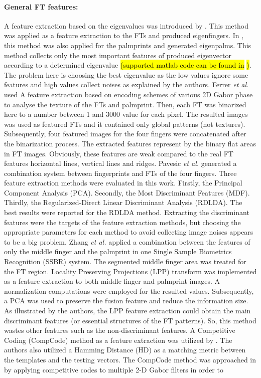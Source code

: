 \documentclass[review]{elsarticle}
\begin{document}
	\paragraph{\textbf{General FT features:}} A feature extraction based on the eigenvalues was introduced by \cite{Ribaric2005Anonline,Ribaric2005ABiometric}. This method was applied as a feature extraction to the FTs and produced eigenfingers. In \cite{Ribaric2005ABiometric}, this method was also applied for the palmprints and generated eigenpalms. This method collects only the most important features of produced eigenvector according to a determined eigenvalue \hl{(supported matlab code can be found in} \cite{Eigenvalues_Eigenvectors}\hl{)}. The problem here is choosing the best eigenvalue as the low values ignore some features and high values collect noises as explained by the authors. Ferrer \textit{et al.} \cite{Ferrer2007Low} used A feature extraction based on encoding schemes of various 2D Gabor phase \cite{gabor_filter} to analyse the texture of the FTs and palmprint. Then, each FT was binarized here to a number between 1 and 3000 value for each pixel. The resulted images was used as featured FTs and it contained only global patterns (not textures). Subsequently, four featured images for the four fingers were concatenated after the binarization process. The extracted features represent by the binary flat areas in FT images. Obviously, these features are weak compared to the real FT features horizontal lines, vertical lines and ridges. Pavesic \textit{et al.} \cite{Pavesic2009Finger-based} generated a combination system between fingerprints and FTs of the four fingers. Three feature extraction methods were evaluated in this work. Firstly, the Principal Component Analysis (PCA). Secondly, the Most Discriminant Features (MDF). Thirdly, the Regularized-Direct Linear Discriminant Analysis (RDLDA). The best results were reported for the RDLDA method. Extracting the discriminant features were the targets of the feature extraction methods, but choosing the appropriate parameters for each method to avoid collecting image noises appears to be a big problem. Zhang \textit{et al.} \cite{Zhang2010hand} applied a combination between the features of only the middle finger and the palmprint in one Single Sample Biometrics Recognition (SSBR) system. The segmented middle finger area was treated for the FT region. Locality Preserving Projections (LPP) transform was implemented as a feature extraction to both middle finger and palmprint images. A normalization computations were employed for the resulted values. Subsequently, a PCA was used to preserve the fusion feature and reduce the information size. As illustrated by the authors, the LPP feature extraction could obtain the main discriminant features (or essential structures of the FT patterns). So, this method wastes other features such as the non-discriminant features. A Competitive Coding (CompCode) method as a feature extraction was utilized by \cite{Kanhangad2011AUnified}. The authors also utilized a Hamming Distance (HD) as a matching metric between the templates and the testing vectors. The CompCode method was approached in \cite{Kong2004Competitive} by applying competitive codes to multiple 2-D Gabor filters in order to 
\end{document}
